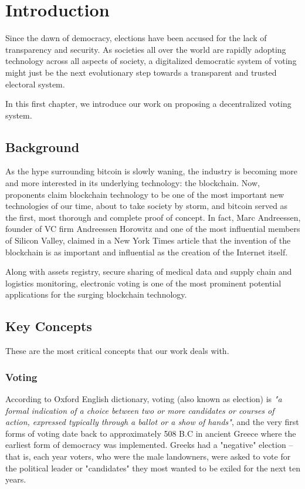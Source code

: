 \chapter{Introduction}

Since the dawn of democracy, elections have been accused for the lack of transparency and security. As societies all over the world are rapidly adopting technology across all aspects of society, a digitalized democratic system of voting might just be the next evolutionary step towards a transparent and trusted electoral system.

In this first chapter, we introduce our work on proposing a decentralized voting system.

\section{Background}

As the hype surrounding bitcoin\cite{satoshinakamotoBitcoinPeertoPeerElectronic} is slowly waning, the industry is becoming more and more interested in its underlying technology: the blockchain. Now, proponents claim blockchain technology to be one of the most important new technologies of our time, about to take society by storm, and bitcoin served as the first, most thorough and complete proof of concept. In fact, Marc Andreessen, founder of VC firm Andreessen Horowitz and one of the most influential members of Silicon Valley, claimed in a New York Times article that the invention of the blockchain is as important and influential as the creation of the Internet itself\cite{andreessenWhyBitcoinMatters1390323270}.\smallskip

Along with assets registry, secure sharing of medical data and supply chain and logistics monitoring, electronic voting is one of the most prominent potential applications for the surging blockchain technology.

\section{Key Concepts}

These are the most critical concepts that our work deals with.

\subsection{Voting}

According to Oxford English dictionary, voting (also known as election) is \textit{"a formal indication of a choice between two or more candidates or courses of action, expressed typically through a ballot or a show of hands"}, and the very first forms of voting date back to approximately 508 B.C in ancient Greece where the earliest form of democracy was implemented\cite{mikehoganHistoryElectionsOnline}. Greeks had a "negative" election -- that is, each year voters, who were the male landowners, were asked to vote for the political leader or "candidates" they most wanted to be exiled for the next ten years.


